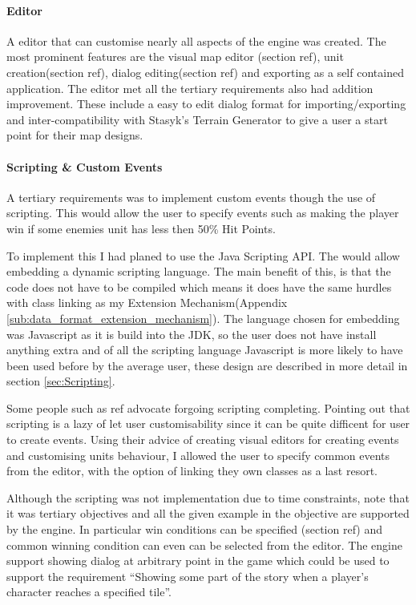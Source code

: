 \paragraph{Editor\\}
A editor that can customise nearly all aspects of the engine was created.  The most prominent features are the visual map editor (section ref), unit creation(section ref), dialog editing(section ref) and exporting as a self contained application.  The editor met all the  tertiary requirements also had addition improvement. These include a easy to edit dialog format for importing/exporting and inter-compatibility  with Stasyk’s Terrain Generator to give a user a start point for their map designs.


\paragraph{Scripting \& Custom Events\\}
A tertiary requirements was to implement custom events though the use of scripting.  This would allow the user to specify events such as making the player win if some enemies unit has less then 50\% Hit Points. 

To implement this I had planed to use the Java Scripting API\cite{javas}. The would allow embedding a dynamic scripting language.  The main benefit of this, is that the code does not have to be compiled which means it does have the same hurdles with class linking as my Extension Mechanism(Appendix \ref{sub:data_format_extension_mechanism}).   The language chosen for embedding was Javascript  as it is build into the JDK, so the user does not have install anything extra and of all the scripting language Javascript  is more likely to have been used before by the average user, these design are described in more detail in section \ref{sec:Scripting}. 

Some people such as ref  advocate forgoing scripting completing. Pointing out that scripting is a lazy of let user customisability since it can be quite difficent for user to create events.  Using their advice of creating visual editors for creating events and customising units behaviour, I allowed the user to specify common events from the editor, with the option of linking they own classes as a last resort. 

Although the scripting was not implementation due to time constraints, note that it was  tertiary objectives and all the given example in the objective are supported by the engine. In particular win conditions can be specified (section ref) and common winning condition can even can be selected from the editor.  The engine support showing dialog at arbitrary point in the game which could be used to support the requirement ``Showing some part of the story when a player’s character reaches a specified tile''.

